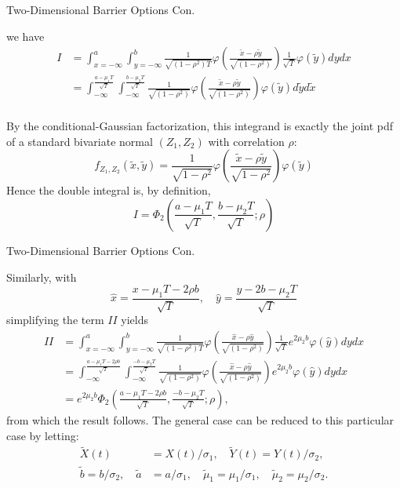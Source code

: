 \documentclass{beamer}
\begin{document}
\begin{frame}{Two-Dimensional Barrier Options Con.}

    {\footnotesize \footnotesize
    \par  we have
    \begin{align*}
    I &= \int_{x=-\infty}^a \int_{y=-\infty}^b \frac{1}{\sqrt{(1-\rho^2)T}} \varphi \left( \frac{\tilde{x}-\rho\tilde{y}}{\sqrt{(1-\rho^2)}} \right)
     \frac{1}{\sqrt{T}} \varphi (\tilde{y}) dy dx \\
    &= \int_{-\infty}^{\frac{a-\mu_1 T}{\sqrt{T}}} \int_{-\infty}^{\frac{b-\mu_2 T}{\sqrt{T}}} \frac{1}{\sqrt{(1-\rho^2)}} 
    \varphi \left( \frac{\tilde{x}-\rho\tilde{y}}{\sqrt{(1-\rho^2)}} \right) \varphi (\tilde{y}) d\tilde{y} d\tilde{x}\\
    \end{align*}\pause
    \par By the conditional-Gaussian factorization, this integrand is exactly the joint pdf of a standard bivariate normal \((Z_1, Z_2)\) with correlation \(\rho\):
\[
f_{Z_1, Z_2} (\tilde{x}, \tilde{y}) = \frac{1}{\sqrt{1 - \rho^2}} \varphi \left( \frac{\tilde{x} - \rho \tilde{y}}{\sqrt{1 - \rho^2}} \right) \varphi (\tilde{y})
\]
Hence the double integral is, by definition,
\[
I = \Phi_2 \left( \frac{a - \mu_1 T}{\sqrt{T}}, \frac{b - \mu_2 T}{\sqrt{T}}; \rho \right)
\]
            }
        
\end{frame}

\begin{frame}{Two-Dimensional Barrier Options Con.}

    {\footnotesize \footnotesize
    \par Similarly, with
        \[
    \hat{x} = \frac{x - \mu_1 T - 2 \rho b}{\sqrt{T}}, \quad \hat{y} = \frac{y - 2b - \mu_2 T}{\sqrt{T}}
    \]
    simplifying the term \( II \) yields
    \begin{align*}
    II &= \int_{x=-\infty}^{a} \int_{y=-\infty}^{b} \frac{1}{\sqrt{(1 - \rho^2)T}} \varphi \left( \frac{\hat{x} - \rho \hat{y}}{\sqrt{(1 - \rho^2)}} \right) \frac{1}{\sqrt{T}} e^{2 \mu_2 b} \varphi (\hat{y}) dy dx \\
    &= \int_{-\infty}^{\frac{a - \mu_1 T - 2 \rho b}{\sqrt{T}}} \int_{-\infty}^{\frac{-b - \mu_2 T}{\sqrt{T}}} \frac{1}{\sqrt{(1 - \rho^2)}} \varphi \left( \frac{\hat{x} - \rho \hat{y}}{\sqrt{(1 - \rho^2)}} \right) e^{2 \mu_2 b} \varphi (\hat{y}) dy dx \\
    &= e^{2 \mu_2 b} \Phi_2 \left( \frac{a - \mu_1 T - 2 \rho b}{\sqrt{T}}, \frac{-b - \mu_2 T}{\sqrt{T}} ; \rho \right),
    \end{align*}\pause
    from which the result follows. The general case can be reduced to this particular case by letting:
    \begin{align*}
        \tilde{X}(t) &= X(t)/\sigma_1, \quad \tilde{Y}(t) = Y(t)/\sigma_2,\\
        \tilde{b} = b/\sigma_2, \quad \tilde{a} &= a/\sigma_1, \quad \tilde{\mu}_1 = \mu_1/\sigma_1, \quad \tilde{\mu}_2 = \mu_2/\sigma_2.
    \end{align*}
    }
    
\end{frame}
\end{document}
